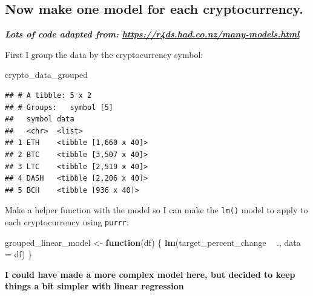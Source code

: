 \documentclass[
]{book}
\newenvironment{Shaded}{\begin{snugshade}}{\end{snugshade}}
\newcommand{\ControlFlowTok}[1]{\textcolor[rgb]{0.13,0.29,0.53}{\textbf{#1}}}
\newcommand{\DataTypeTok}[1]{\textcolor[rgb]{0.13,0.29,0.53}{#1}}
\newcommand{\KeywordTok}[1]{\textcolor[rgb]{0.13,0.29,0.53}{\textbf{#1}}}
\newcommand{\NormalTok}[1]{#1}
\newcommand{\OperatorTok}[1]{\textcolor[rgb]{0.81,0.36,0.00}{\textbf{#1}}}
\newcommand{\StringTok}[1]{\textcolor[rgb]{0.31,0.60,0.02}{#1}}
\begin{document}
\hypertarget{now-make-one-model-for-each-cryptocurrency.}{%
\subsection{Now make one model for each cryptocurrency.}\label{now-make-one-model-for-each-cryptocurrency.}}

\textbf{\emph{Lots of code adapted from: \url{https://r4ds.had.co.nz/many-models.html}}}

First I group the data by the cryptocurrency symbol:

\begin{Shaded}
\end{Shaded}

\begin{Shaded}
\begin{Highlighting}[]
\NormalTok{crypto_data_grouped}
\end{Highlighting}
\end{Shaded}

\begin{verbatim}
## # A tibble: 5 x 2
## # Groups:   symbol [5]
##   symbol data                 
##   <chr>  <list>               
## 1 ETH    <tibble [1,660 x 40]>
## 2 BTC    <tibble [3,507 x 40]>
## 3 LTC    <tibble [2,519 x 40]>
## 4 DASH   <tibble [2,206 x 40]>
## 5 BCH    <tibble [936 x 40]>
\end{verbatim}

Make a helper function with the model so I can make the \texttt{lm()} model to apply to each cryptocurrency using \texttt{purrr}:

\begin{Shaded}
\begin{Highlighting}[]
\NormalTok{grouped_linear_model <-}\StringTok{ }\ControlFlowTok{function}\NormalTok{(df) \{}
  \KeywordTok{lm}\NormalTok{(target_percent_change }\OperatorTok{~}\StringTok{ }\NormalTok{., }\DataTypeTok{data =}\NormalTok{ df)}
\NormalTok{\}}
\end{Highlighting}
\end{Shaded}

\textbf{I could have made a more complex model here, but decided to keep things a bit simpler with linear regression}
\end{document}
